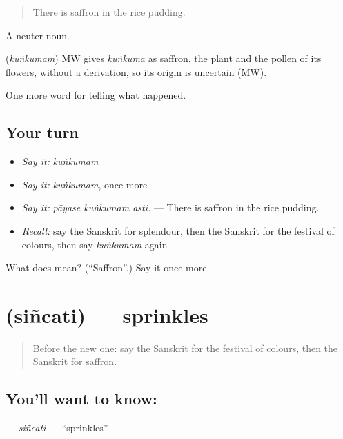 \begin{quote}
There is saffron in the rice pudding.
\end{quote}

A neuter noun.

\begin{cousinweb}
\textbf{} (\emph{kuṅkumam}) MW gives \emph{kuṅkuma} as saffron, the plant and the pollen of its flowers, without a derivation, so its origin is uncertain (MW).
\end{cousinweb}

\begin{grammarlens}[title={What you've built}]
One more word for telling what happened.
\end{grammarlens}

\subsection*{Your turn}
\begin{itemize}
\raggedright
  \item \emph{Say it:} \emph{kuṅkumam}
  \item \emph{Say it:} \emph{kuṅkumam}, once more
  \item \emph{Say it:} \emph{pāyase kuṅkumam asti.} — There is saffron in the rice pudding.
  \item \emph{Recall:} say the Sanskrit for splendour, then the Sanskrit for the festival of colours, then say \emph{kuṅkumam} again
\end{itemize}

\begin{tcolorbox}[breakable,colback=teal!4,colframe=teal!35!black,title={Before you move on}]
What does  mean? (\textquotedblleft{}Saffron\textquotedblright{}.) Say it once more.
\end{tcolorbox}
\section[\texorpdfstring{\sk{सिञ्चति} (siñcati)}{सिञ्चति (siñcati)}]{ (siñcati) — sprinkles}

\label{lesson:SA-C327-sincati}



\begin{quote}
Before the new one: say the Sanskrit for the festival of colours, then the Sanskrit for saffron.
\end{quote}

\subsection*{You'll want to know: }
\textbf{} — \emph{siñcati} — \textquotedblleft{}sprinkles\textquotedblright{}.

